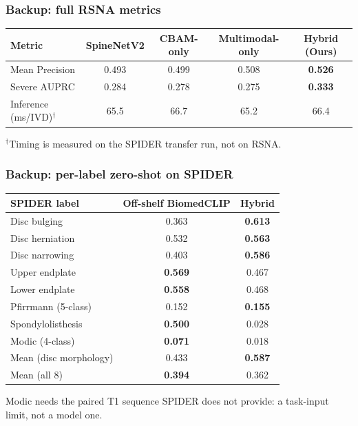 \documentclass[12pt]{beamer}
\newcommand{\bst}[1]{\textcolor{best}{\textbf{#1}}}
\begin{document}
\appendix
\begin{frame}
\frametitle{Backup: full RSNA metrics}
\begin{table}
\centering
\scriptsize
\setlength{\tabcolsep}{3pt}
\begin{tabular}{lcccc}
\toprule
\textbf{Metric} & \textbf{SpineNetV2} & \textbf{CBAM-only} & \textbf{Multimodal-only} & \textbf{Hybrid (Ours)} \\
\midrule
Mean Precision  & 0.493 & 0.499 & 0.508 & \bst{0.526} \\
Severe AUPRC    & 0.284 & 0.278 & 0.275 & \bst{0.333} \\
Inference (ms/IVD)$^{\dagger}$ & 65.5 & 66.7 & 65.2 & 66.4 \\
\bottomrule
\end{tabular}
\end{table}
{\scriptsize $^{\dagger}$Timing is measured on the SPIDER transfer run, not on RSNA.}
\end{frame}

\begin{frame}
\frametitle{Backup: per-label zero-shot on SPIDER}
\begin{table}
\centering
\scriptsize
\setlength{\tabcolsep}{4pt}
\begin{tabular}{lcc}
\toprule
\textbf{SPIDER label} & \textbf{Off-shelf BiomedCLIP} & \textbf{Hybrid} \\
\midrule
Disc bulging         & 0.363 & \bst{0.613} \\
Disc herniation      & 0.532 & \bst{0.563} \\
Disc narrowing       & 0.403 & \bst{0.586} \\
\midrule
Upper endplate       & \bst{0.569} & 0.467 \\
Lower endplate       & \bst{0.558} & 0.468 \\
Pfirrmann (5-class)  & 0.152 & \bst{0.155} \\
Spondylolisthesis    & \bst{0.500} & 0.028 \\
Modic (4-class)      & \bst{0.071} & 0.018 \\
\midrule
Mean (disc morphology) & 0.433 & \bst{0.587} \\
Mean (all 8)           & \bst{0.394} & 0.362 \\
\bottomrule
\end{tabular}
\end{table}
{\scriptsize Modic needs the paired T1 sequence SPIDER does not provide: a task-input limit, not a model one.}
\end{frame}
\end{document}
